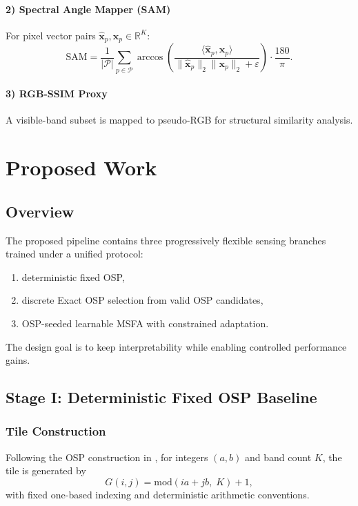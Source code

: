 \documentclass[journal]{IEEEtran}
\begin{document}
\paragraph{2) Spectral Angle Mapper (SAM)}
For pixel vector pairs $\hat{\mathbf{x}}_p,\mathbf{x}_p\in\mathbb{R}^{K}$:
\begin{equation}
\mathrm{SAM}=
\frac{1}{|\mathcal{P}|}
\sum_{p\in\mathcal{P}}
\arccos
\left(
\frac{\langle \hat{\mathbf{x}}_p,\mathbf{x}_p\rangle}
{\|\hat{\mathbf{x}}_p\|_2\|\mathbf{x}_p\|_2+\varepsilon}
\right)\cdot\frac{180}{\pi}.
\end{equation}

\paragraph{3) RGB-SSIM Proxy}
A visible-band subset is mapped to pseudo-RGB for structural similarity analysis.

\section{Proposed Work}

\subsection{Overview}
The proposed pipeline contains three progressively flexible sensing branches trained under a unified protocol:
\begin{enumerate}
\item deterministic fixed OSP,
\item discrete Exact OSP selection from valid OSP candidates,
\item OSP-seeded learnable MSFA with constrained adaptation.
\end{enumerate}
The design goal is to keep interpretability while enabling controlled performance gains.

\subsection{Stage I: Deterministic Fixed OSP Baseline}
\subsubsection{Tile Construction}
Following the OSP construction in \cite{diaz2023osp}, for integers $(a,b)$ and band count $K$, the tile is generated by
\begin{equation}
G(i,j)=\mathrm{mod}(i a + j b,\;K)+1,
\label{eq:osp_tile}
\end{equation}
with fixed one-based indexing and deterministic arithmetic conventions.
\end{document}
